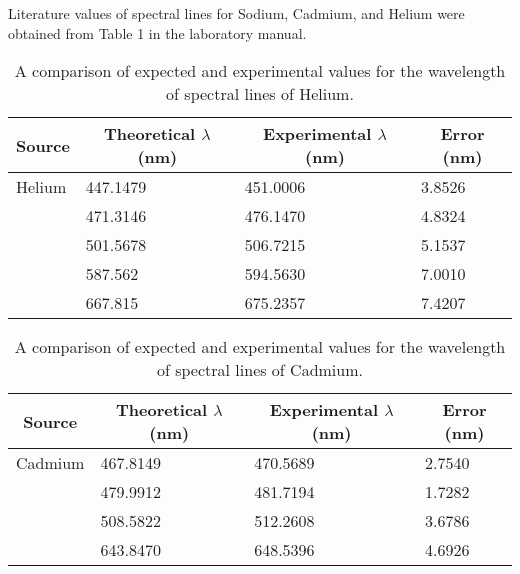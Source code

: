 \begin{enumerate}
Literature values of spectral lines for Sodium, Cadmium, and Helium were obtained from Table 1 in the laboratory manual.


\begin{table}[ht]
\center
\begin{tabular}{|l|l|l|l|}
\hline
\multicolumn{1}{|c|}{Source} & \multicolumn{1}{c|}{Theoretical $\lambda$ (nm)} & \multicolumn{1}{c|}{Experimental $\lambda$ (nm)} & \multicolumn{1}{c|}{Error (nm)} \\ \hline
Helium                       & 447.1479                                        & 451.0006                                   & 3.8526                          \\ \hline
                             & 471.3146                                        & 476.1470                                         & 4.8324                          \\ \hline
                             & 501.5678                                        & 506.7215                                         & 5.1537                          \\ \hline
                             & 587.562                                         & 594.5630                                         & 7.0010                          \\ \hline
                             & 667.815                                         & 675.2357                                         & 7.4207                          \\ \hline
\end{tabular}
\caption{A comparison of expected and experimental values for the wavelength of spectral lines of Helium.}
\label{tab:spcg6}
\end{table}


\begin{table}[ht]
\center
\begin{tabular}{|l|l|l|l|}
\hline
\multicolumn{1}{|c|}{Source} & \multicolumn{1}{c|}{Theoretical $\lambda$ (nm)} & \multicolumn{1}{c|}{Experimental $\lambda$ (nm)} & \multicolumn{1}{c|}{Error (nm)} \\ \hline
Cadmium                       & 467.8149                                        & 470.5689                                         & 2.7540                          \\ \hline
                             & 479.9912                                        & 481.7194                                         & 1.7282                          \\ \hline
                             & 508.5822                                        & 512.2608                                         & 3.6786                          \\ \hline
                             & 643.8470                                        & 648.5396                                         & 4.6926                          \\ \hline
\end{tabular}
\caption{A comparison of expected and experimental values for the wavelength of spectral lines of Cadmium.}
\label{tab:spcg7}
\end{table}


\end{enumerate}
